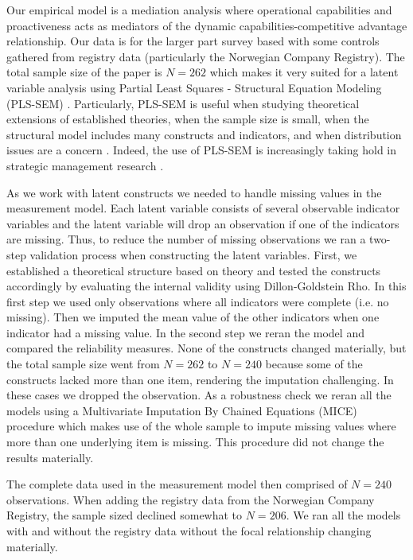 \documentclass[review,fleqn]{elsarticle}\usepackage[]{graphicx}\usepackage[]{color}
\begin{document}
Our empirical model is a mediation analysis where operational capabilities and
proactiveness acts as mediators of the dynamic capabilities-competitive advantage
relationship. Our data is for the larger part survey based with some controls gathered
from registry data (particularly the Norwegian Company Registry). The total sample size of
the paper is $N=262$ which makes it very suited for a latent variable analysis using
Partial Least Squares - Structural Equation Modeling (PLS-SEM)
\citep{Hair2010}. Particularly, PLS-SEM is useful when studying theoretical extensions of
established theories, when the sample size is small, when the structural model includes
many constructs and indicators, and when distribution issues are a concern
\citep{Hair2019}. Indeed, the use of PLS-SEM is increasingly taking hold in strategic
management research \citep{Hair2012}.

As we work with latent constructs we needed to handle missing values in the measurement
model. Each latent variable consists of several observable indicator variables and the
latent variable will drop an observation if one of the indicators are missing. Thus, to
reduce the number of missing observations we ran a two-step validation process when
constructing the latent variables. First, we established a theoretical structure based on
theory and tested the constructs accordingly by evaluating the internal validity using
Dillon-Goldstein Rho. In this first step we used only observations where all indicators
were complete (i.e. no missing). Then we imputed the mean value of the other indicators
when one indicator had a missing value. In the second step we reran the model and compared
the reliability measures. None of the constructs changed materially, but the total sample
size went from $N=262$ to $N=240$ because some of the constructs lacked more than one
item, rendering the imputation challenging. In these cases we dropped the observation. As
a robustness check we reran all the models using a Multivariate Imputation By Chained
Equations (MICE) procedure which makes use of the whole sample to impute missing values
where more than one underlying item is missing. This procedure did not change the results
materially.

The complete data used in the measurement model then comprised of $N=240$
observations. When adding the registry data from the Norwegian Company Registry, the
sample sized declined somewhat to $N=206$. We ran all the models with and without the
registry data without the focal relationship changing materially.
\end{document}
